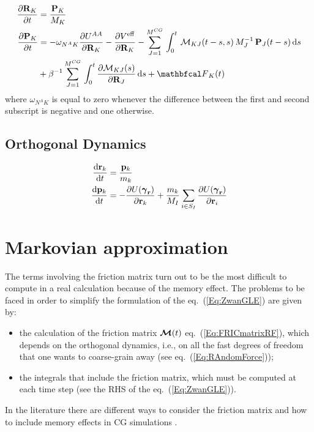 \documentclass[10pt,a4paper]{book}
\theoremstyle{definition}
\begin{document}
\begin{align}
 \nonumber
 \pard{\bfR_{K}}{t} &= \frac{\bfP_{K}}{M_{K}} \\
 \nonumber 
 \pard{\bfP_{K}}{t} &= -\omega_{\NA{} K} \pard{\pot^{AA}}{\bfR_{K}} - \pard{\Veff}{\bfR_{K}} 
 - \sum_{J=1}^{\ncg}\,\int_{0}^{t}\,\fricmat_{KJ}(t-s,s)\,M_J^{-1}\,\bfP_J(t-s) \,\diff s \\
 &+ \beta^{-1} \sum_{J=1}^{\ncg} \,\int_{0}^{t} \pard{\fricmat_{KJ}(s)}{\bfR_{J}} \,\diff s + \fprojbf_{K}(t)
 \label{Eq:DevB} 
\end{align}
%
where $\omega_{N^AK}$ is equal to zero whenever the difference between the first and second subscript is negative and one otherwise.


\section{Orthogonal Dynamics}
\label{Sec:OD}

\begin{align}
	\frac{\mbox{d}\mathbf{r}_k}{\mbox{d}t} &= \frac{\mathbf{p}_k}{m_{k}} \\
	\frac{\mbox{d}\mathbf{p}_k}{\mbox{d}t} &= - \frac{\partial U(\boldsymbol\gamma_{\mathbf{r}})}{\partial\mathbf{r}_k} + \frac{m_k}{M_I}\sum_{i\in S_I}\frac{\partial U(\boldsymbol\gamma_{\mathbf{r}})}{\partial\mathbf{r}_i}
	\label{Eq:orth} 
\end{align}

\chapter{Markovian approximation}
\label{Sec:MarkovApprox}

The terms involving the friction matrix turn out to be the most difficult to compute in a real calculation because of the memory effect. 
The problems to be faced in order to simplify the formulation of the eq.~(\ref{Eq:ZwanGLE}) are given by:
\begin{itemize}
\item[-] the calculation of the friction matrix $\boldsymbol{\mathcal{M}}(t)$ eq.~(\ref{Eq:FRICmatrixRF}), which depends on the orthogonal dynamics, i.e., on all the fast degrees of freedom that one wants to coarse-grain away (see eq.~(\ref{Eq:RAndomForce}));   
\item[-] the integrals that include the friction matrix, which must be computed at each time step (see the RHS of the eq.~(\ref{Eq:ZwanGLE})).
\end{itemize}
In the literature there are different ways to consider the friction matrix \cite{Chorin2000,Kauzlaric2011} and how to include memory effects in CG simulations \cite{Izvekov2017,Jung2017,Li2015,Yuanran2018}.
\end{document}
